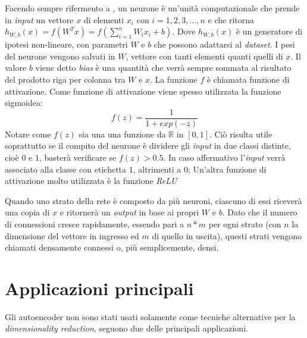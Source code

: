 \clearpage
Facendo sempre rifermento a \cite{ng_sparse_ae}, un neurone è un'unità computazionale che prende in \textit{input} un vettore $x$ di elementi $x_i$ con $i=1,2,3,\dots,n$ e che ritorna $h_{W,b}(x) = f(W^Tx) = f(\sum_{i=1}^{n} W_i x_i + b)$.
Dove $h_{W,b}(x)$ è un generatore di ipotesi non-lineare, con parametri $W$ e $b$ che possono adattarsi al \textit{dataset}.
I pesi del neurone vengono salvati in $W$, vettore con tanti elementi quanti quelli di $x$.
Il valore $b$ viene detto \textit{bias} è una quantità che verrà sempre sommata al risultato del prodotto riga per colonna tra $W$ e $x$.
La funzione $f$ è chiamata funzione di attivazione.
Come funzione di attivazione viene spesso utilizzata la funzione sigmoidea:
\begin{equation*}
  f(z) = \frac{1}{1 + exp(-z)}
\end{equation*} %
Notare come $f(z)$ sia una una funzione da $\mathbb{R}$ in $[0,1]$.
Ciò risulta utile soprattutto se il compito del neurone è dividere gli \textit{input} in due classi distinte, cioè $0$ e $1$, basterà verificare se $f(z)>0.5$.
In caso affermativo l'\textit{input} verrà associato alla classe con etichetta $1$, altrimenti a $0$;
Un'altra funzione di attivazione molto utilizzata è la funzione \textit{ReLU}


Quando uno strato della rete è composto da più neuroni, ciascuno di essi riceverà una copia di $x$ e ritornerà un \textit{output} in base ai propri $W$ e $b$.
Dato che il numero di connessioni cresce rapidamente, essendo pari a $n*m$ per ogni strato (con $n$ la dimensione del vettore in ingresso ed $m$ di quello in uscita), questi strati vengono chiamati densamente connessi o, più semplicemente, densi.

\clearpage
\section{Applicazioni principali}
Gli autoencoder non sono stati usati solamente come tecniche alternative per la \textit{dimensionality reduction}, seguono due delle principali applicazioni.

